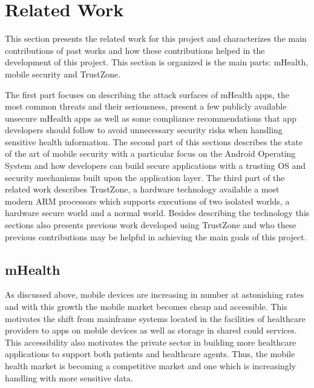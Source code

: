 
% 
% 
\section{Related Work}


This section presents the related work for this project and characterizes the main contributions of past works and how these contributions helped in the development of this project. This section is organized is the main parts: mHealth, mobile security and TrustZone.

The first part focuses on describing the attack surfaces of mHealth apps, the most common threats and their seriousness, present a few publicly available unsecure mHealth apps as well as some compliance recommendations that app developers should follow to avoid unnecessary security risks when handling sensitive health information. The second part of this sections describes the state of the art of mobile security with a particular focus on the Android Operating System and how developers can build secure applications with a trusting \ac{OS} and security mechanisms built upon the application layer. The third part of the related work describes TrustZone, a hardware technology available a most modern \ac{ARM} processors which supports executions of two isolated worlds, a hardware secure world and a normal world. Besides describing the technology this sections also presents previous work developed using TrustZone and who these previous contributions may be helpful in achieving the main goals of this project. 

\subsection{mHealth}

As discussed above, mobile devices are increasing in number at astonishing rates and with this growth the mobile market becomes cheap and accessible. This motivates the shift from mainframe systems located in the facilities of healthcare providers to apps on mobile devices as well as storage in shared could services. This accessibility also motivates the private sector in building more healthcare applications to support both patients and healthcare agents. Thus, the mobile health market is becoming a competitive market and one which is increasingly handling with more sensitive data.

